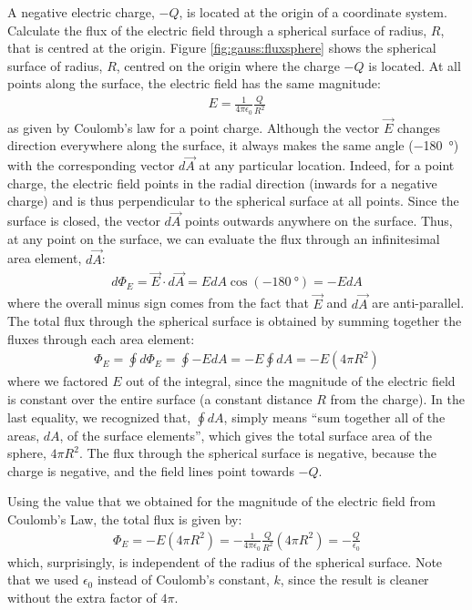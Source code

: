 \begin{example}{A negative electric charge, $-Q$, is located at the origin of a coordinate system. Calculate the flux of the electric field through a spherical surface of radius, $R$, that is centred at the origin.}\label{ex:gauss:qsphere}
Figure \ref{fig:gauss:fluxsphere} shows the spherical surface of radius, $R$, centred on the origin where the charge $-Q$ is located.
At all points along the surface, the electric field has the same magnitude:
\begin{align*}
E=\frac{1}{4\pi\epsilon_0}\frac{Q}{R^2}
\end{align*}
as given by Coulomb's law for a point charge. Although the vector $\vec E$ changes direction everywhere along the surface, it always makes the same angle (\SI{-180}{\degree}) with the corresponding vector $d\vec A$ at any particular location. Indeed, for a point charge, the electric field points in the radial direction (inwards for a negative charge) and is thus perpendicular to the spherical surface at all points. Since the surface is closed, the vector $d\vec A$ points outwards anywhere on the surface. Thus, at any point on the surface, we can evaluate the flux through an infinitesimal area element, $d\vec A$:
\begin{align*}
d\Phi_E=\vec E\cdot d\vec A=EdA\cos(\SI{-180}{\degree})=-EdA
\end{align*}
where the overall minus sign comes from the fact that $\vec E$ and $d\vec A$ are anti-parallel. The total flux through the spherical surface is obtained by summing together the fluxes through each area element:
\begin{align*}
\Phi_E=\oint d\Phi_E=\oint -EdA=-E\oint dA=-E(4\pi R^2)
\end{align*}
where we factored $E$ out of the integral, since the magnitude of the electric field is constant over the entire surface (a constant distance $R$ from the charge). In the last equality, we recognized that, $\oint dA$, simply means ``sum together all of the areas, $dA$, of the surface elements'', which gives the total surface area of the sphere, $4\pi R^2$. The flux through the spherical surface is negative, because the charge is negative, and the field lines point towards $-Q$.

Using the value that we obtained for the magnitude of the electric field from Coulomb's Law, the total flux is given by:
\begin{align*}
\Phi_E=-E(4\pi R^2)=-\frac{1}{4\pi\epsilon_0}\frac{Q}{R^2}(4\pi R^2)=-\frac{Q}{\epsilon_0}
\end{align*}
which, surprisingly, is independent of the radius of the spherical surface. Note that we used $\epsilon_0$ instead of Coulomb's constant, $k$, since the result is cleaner without the extra factor of $4\pi$. 


\end{example}
